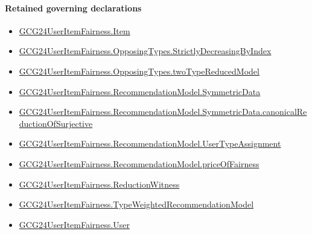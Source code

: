 \documentclass[10pt]{article}
\begin{document}
\paragraph{Retained governing declarations}
\begin{itemize}\raggedright
\item \hyperlink{governing-declaration-a7c560a429c6e204}{GCG24\allowbreak{}User\allowbreak{}Item\allowbreak{}Fairness.\allowbreak{}Item}
\item \hyperlink{governing-declaration-8278344d2ddef9a8}{GCG24\allowbreak{}User\allowbreak{}Item\allowbreak{}Fairness.\allowbreak{}Opposing\allowbreak{}Types.\allowbreak{}Strictly\allowbreak{}Decreasing\allowbreak{}By\allowbreak{}Index}
\item \hyperlink{governing-declaration-b87168913e966e7f}{GCG24\allowbreak{}User\allowbreak{}Item\allowbreak{}Fairness.\allowbreak{}Opposing\allowbreak{}Types.\allowbreak{}two\allowbreak{}Type\allowbreak{}Reduced\allowbreak{}Model}
\item \hyperlink{governing-declaration-5bf2c3489c614d0a}{GCG24\allowbreak{}User\allowbreak{}Item\allowbreak{}Fairness.\allowbreak{}Recommendation\allowbreak{}Model.\allowbreak{}Symmetric\allowbreak{}Data}
\item \hyperlink{governing-declaration-74d9be2e84dd2134}{GCG24\allowbreak{}User\allowbreak{}Item\allowbreak{}Fairness.\allowbreak{}Recommendation\allowbreak{}Model.\allowbreak{}Symmetric\allowbreak{}Data.\allowbreak{}canonical\allowbreak{}Reduction\allowbreak{}Of\allowbreak{}Surjective}
\item \hyperlink{governing-declaration-ff90b1efab93f1aa}{GCG24\allowbreak{}User\allowbreak{}Item\allowbreak{}Fairness.\allowbreak{}Recommendation\allowbreak{}Model.\allowbreak{}User\allowbreak{}Type\allowbreak{}Assignment}
\item \hyperlink{paper-prerequisite-b92c02c4ebadd933}{GCG24\allowbreak{}User\allowbreak{}Item\allowbreak{}Fairness.\allowbreak{}Recommendation\allowbreak{}Model.\allowbreak{}price\allowbreak{}Of\allowbreak{}Fairness}
\item \hyperlink{governing-declaration-09e04866bceb3cdb}{GCG24\allowbreak{}User\allowbreak{}Item\allowbreak{}Fairness.\allowbreak{}Reduction\allowbreak{}Witness}
\item \hyperlink{governing-declaration-9d0d71ba8ee67837}{GCG24\allowbreak{}User\allowbreak{}Item\allowbreak{}Fairness.\allowbreak{}Type\allowbreak{}Weighted\allowbreak{}Recommendation\allowbreak{}Model}
\item \hyperlink{governing-declaration-800dd691bc989470}{GCG24\allowbreak{}User\allowbreak{}Item\allowbreak{}Fairness.\allowbreak{}User}
\end{itemize}
\end{document}
